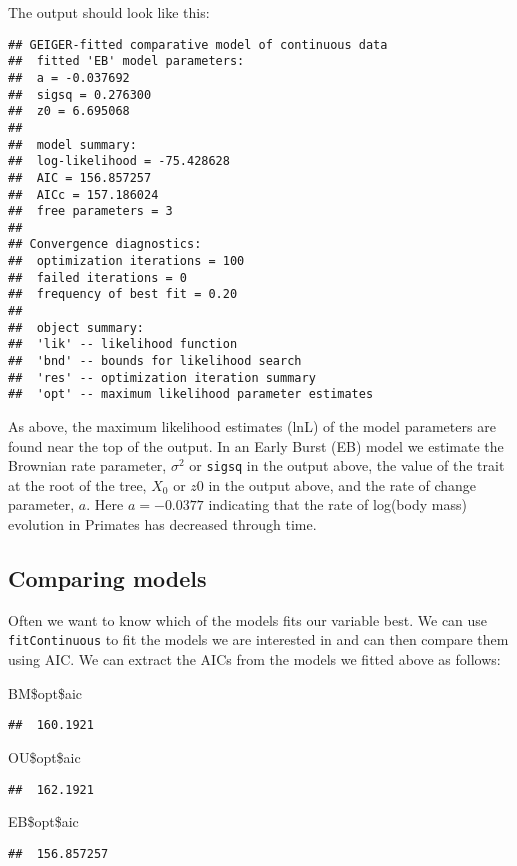 \documentclass[11pt]{article}
\newcommand{\NormalTok}[1]{{#1}}
\begin{document}
The output should look like this:

\begin{verbatim}
## GEIGER-fitted comparative model of continuous data
##  fitted 'EB' model parameters:
##  a = -0.037692
##  sigsq = 0.276300
##  z0 = 6.695068
## 
##  model summary:
##  log-likelihood = -75.428628
##  AIC = 156.857257
##  AICc = 157.186024
##  free parameters = 3
## 
## Convergence diagnostics:
##  optimization iterations = 100
##  failed iterations = 0
##  frequency of best fit = 0.20
## 
##  object summary:
##  'lik' -- likelihood function
##  'bnd' -- bounds for likelihood search
##  'res' -- optimization iteration summary
##  'opt' -- maximum likelihood parameter estimates
\end{verbatim}

As above, the maximum likelihood estimates (lnL) of the model parameters are found near the top of the output. In an Early Burst (EB) model we estimate the Brownian rate parameter, $\sigma^2$ or \texttt{sigsq} in the output above, the value of the trait at the root of the tree, $X_0$ or \texttt{$z0$} in the output above, and the rate of change parameter, $a$. Here $a = -0.0377$ indicating that the rate of log(body mass) evolution in Primates has decreased through time.

\subsection{Comparing models}

Often we want to know which of the models fits our variable best. We can use \texttt{fitContinuous} to fit the models we are interested in and can then compare them using AIC. We can extract the AICs from the models we fitted above as follows:

\begin{snugshade}
\begin{Highlighting}[]
\NormalTok{BM\$opt\$aic}
\end{Highlighting}
\end{snugshade}
\begin{verbatim}
##  160.1921
\end{verbatim}
\begin{snugshade}
\begin{Highlighting}[]
\NormalTok{OU\$opt\$aic}
\end{Highlighting}
\end{snugshade}
\begin{verbatim}
##  162.1921
\end{verbatim}
\begin{snugshade}
\begin{Highlighting}[]
\NormalTok{EB\$opt\$aic}
\end{Highlighting}
\end{snugshade}
\begin{verbatim}
##  156.857257
\end{verbatim}
\end{document}
